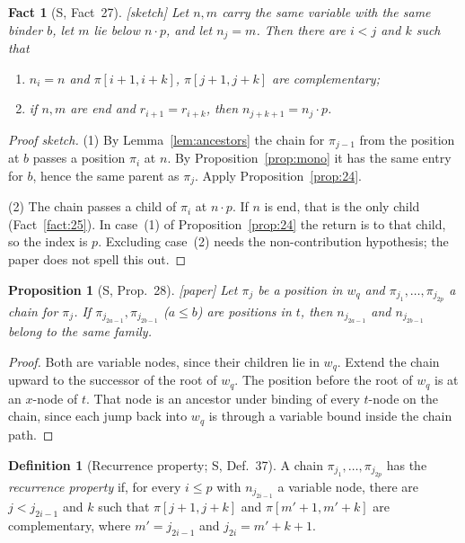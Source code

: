 \documentclass[11pt]{article}
\newcommand{\suc}[2]{#1{\cdot}#2}
\newcommand{\iv}[2]{\pi[#1,#2]}
\newcommand{\Paper}{\textsf{[paper]}}
\newcommand{\Sketch}{\textsf{[sketch]}}
\theoremstyle{plain}
\newtheorem{proposition}[theorem]{Proposition}
\newtheorem{fact}[theorem]{Fact}
\theoremstyle{definition}
\newtheorem{definition}[theorem]{Definition}
\theoremstyle{remark}
\begin{document}
\begin{fact}[S, Fact~27]\label{fact:27}
\Sketch{} Let $n,m$ carry the same variable with the same binder $b$,
let $m$ lie below $\suc np$, and let $n_j=m$.  Then there are $i<j$ and
$k$ such that
\begin{enumerate}
\item $n_i=n$ and $\iv{i+1}{i+k}$, $\iv{j+1}{j+k}$ are complementary;
\item if $n,m$ are end and $r_{i+1}=r_{i+k}$, then $n_{j+k+1}=\suc{n_j}p$.
\end{enumerate}
\end{fact}
\begin{proof}[Proof sketch]
(1) By Lemma~\ref{lem:ancestors} the chain for $\pi_{j-1}$ from the
position at $b$ passes a position $\pi_i$ at $n$.  By
Proposition~\ref{prop:mono} it has the same entry for $b$, hence the
same parent as $\pi_j$.  Apply Proposition~\ref{prop:24}.

(2) The chain passes a child of $\pi_i$ at $\suc np$.  If $n$ is end,
that is the only child (Fact~\ref{fact:25}).  In case~(1) of
Proposition~\ref{prop:24} the return is to that child, so the index is
$p$.  Excluding case~(2) needs the non-contribution hypothesis; the
paper does not spell this out.
\end{proof}

\begin{proposition}[S, Prop.~28]\label{prop:28}
\Paper{} Let $\pi_j$ be a position in $w_q$ and
$\pi_{j_1},\dots,\pi_{j_{2p}}$ a chain for $\pi_j$.  If
$\pi_{j_{2a-1}},\pi_{j_{2b-1}}$ ($a\le b$) are positions in $t$, then
$n_{j_{2a-1}}$ and $n_{j_{2b-1}}$ belong to the same family.
\end{proposition}
\begin{proof}
Both are variable nodes, since their children lie in $w_q$.  Extend the
chain upward to the successor of the root of $w_q$.  The position before
the root of $w_q$ is at an $x$-node of $t$.  That node is an
ancestor under binding of every $t$-node on the chain, since each jump
back into $w_q$ is through a variable bound inside the chain path.
\end{proof}

\begin{definition}[Recurrence property; S, Def.~37]\label{def:recurrence}
A chain $\pi_{j_1},\dots,\pi_{j_{2p}}$ has the \emph{recurrence property}
if, for every $i\le p$ with $n_{j_{2i-1}}$ a variable node, there are
$j<j_{2i-1}$ and $k$ such that $\iv{j+1}{j+k}$ and
$\iv{m'+1}{m'+k}$ are complementary, where $m'=j_{2i-1}$ and
$j_{2i}=m'+k+1$.
\end{definition}
\end{document}
